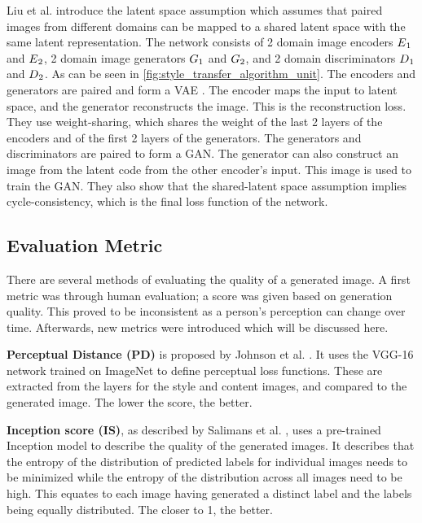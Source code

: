 Liu et al. \cite{Liu2017} introduce the latent space assumption which assumes that paired images from different domains can be mapped to a shared latent space with the same latent representation.
The network consists of 2 domain image encoders $E\textsubscript{$1$}$ and $E\textsubscript{$2$}$, 2 domain image generators $G\textsubscript{$1$}$ and $G\textsubscript{$2$}$, and 2 domain discriminators $D\textsubscript{$1$}$ and $D\textsubscript{$2$}$.
As can be seen in \ref{fig:style_transfer_algorithm_unit}.
The encoders and generators are paired and form a \gls{VAE} \cite{kingma2022}.
The encoder maps the input to latent space, and the generator reconstructs the image.
This is the reconstruction loss.
They use weight-sharing, which shares the weight of the last 2 layers of the encoders and of the first 2 layers of the generators.
The generators and discriminators are paired to form a \gls{GAN}.
The generator can also construct an image from the latent code from the other encoder's input.
This image is used to train the \gls{GAN}.
They also show that the shared-latent space assumption implies cycle-consistency, which is the final loss function of the network.

\subsection{Evaluation Metric}
There are several methods of evaluating the quality of a generated image. 
A first metric was through human evaluation; a score was given based on generation quality.
This proved to be inconsistent as a person's perception can change over time.
Afterwards, new metrics were introduced which will be discussed here. \cite{Hoyez2022}

\textbf{Perceptual Distance (PD)} is proposed by Johnson et al. \cite{Johnson2016}.
It uses the VGG-16 network \cite{Simonyan2015} trained on ImageNet \cite{Deng2009} to define perceptual loss functions.
These are extracted from the layers for the style and content images, and compared to the generated image.
The lower the score, the better.

\textbf{Inception score (IS)}, as described by Salimans et al. \cite{Salimans2016}, uses a pre-trained Inception model \cite{Szegedy2015} to describe the quality of the generated images.
It describes that the entropy of the distribution of predicted labels for individual images needs to be minimized while the entropy of the distribution across all images need to be high.
This equates to each image having generated a distinct label and the labels being equally distributed.
The closer to 1, the better.

